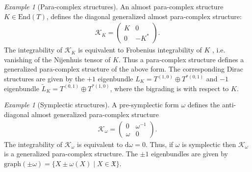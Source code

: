\documentclass[letterpaper,12pt]{article}
\newcommand{\KK}{\mathcal{K}}
\newcommand{\XX}{\mathfrak{X}}
\newcommand{\id}{\mathbbm{1}}
\newcommand{\rd}{\mathrm{d}}
\newcommand{\Endo}{\text{End}}
\theoremstyle{definition}
\theoremstyle{remark}
\theoremstyle{examples}
\newtheorem{Ex}[theorem]{Example}
\begin{document}
\begin{Ex}[Para-complex structures]\label{eg: pc}
An almost para-complex structure $K\in \Endo(T)$, defines the diagonal generalized almost para-complex structure:
\begin{align*}
\KK_K=
\begin{pmatrix}
K & 0 \\
0 & -K^*
\end{pmatrix}.
\end{align*}
The integrability of $\KK_K$ is equivalent to Frobenius integrability of $K$ , i.e. vanishing of the Nijenhuis tensor of $K$.
Thus a para-complex structure defines a generalized para-complex structure of the above form. 
The corresponding Dirac structures are given by the $+1$ eigenbundle $L_K =T^{(1,0)}\oplus T^{*(0,1)}$ and $-1$ eigenbundle $\widetilde{L}_K =T^{(0,1)}\oplus T^{*(1,0)}$, where the bigrading is with respect to $K$.
%
\end{Ex}

\begin{Ex}[Symplectic structures]\label{ex:GpC_sympl}
A pre-symplectic form $\omega$ defines the anti-diagonal almost generalized para-complex structure
\begin{align*}
\KK_\omega=
\begin{pmatrix}
0 & \omega^{-1} \\
\omega & 0
\end{pmatrix}.
\end{align*}
The integrability of $\KK_\omega$ is equivalent to $\rd\omega=0$.
Thus, if $\omega$ is symplectic then $\KK_\omega$ is a generalized para-complex structure.
The $\pm 1$ eigenbundles are given by $\text{graph}(\pm\omega)=\{X\pm\omega(X)\mid X\in \XX\}$.
\end{Ex}
\end{document}
